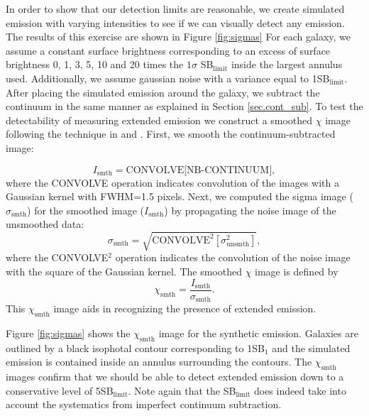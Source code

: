 \documentclass[twocolumn]{aastex61}
\begin{document}
In order to show that our detection limits are reasonable, we create simulated emission with varying intensities to see if we can visually detect any  emission. The results of this exercise are shown in Figure \ref{fig:sigmas} For each galaxy, we assume a constant surface brightness corresponding to an excess of surface brightness 0, 1, 3, 5, 10 and 20 times the $1\sigma$ SB$_{\text{limit}}$ inside the largest annulus used. Additionally, we assume gaussian noise with a variance equal to 1SB$_{\text{limit}}$. After placing the simulated emission around the galaxy, we subtract the continuum in the same manner as explained in Section \ref{sec.cont_sub}. To test the detectability of measuring extended emission we construct a smoothed $\chi$ image following the technique in \cite{Hennawi2013} and \cite{Battaia_2015}. First, we smooth the continuum-subtracted image:

\begin{equation}
I_{\text{smth}}= \text{CONVOLVE[NB-CONTINUUM]},
\end{equation}
where the CONVOLVE operation indicates convolution of the images with a Gaussian kernel with FWHM=1.5 pixels. Next, we computed the sigma image ($\sigma_{\text{smth}}$) for the smoothed image ($I_{\text{smth}}$) by propagating the noise image of the unsmoothed data:
\begin{equation}
\sigma_{\text{smth}}=\sqrt{\text{CONVOLVE}^2[\sigma^2_{\text{unsmth}}]},
\end{equation}
where the CONVOLVE$^2$ operation indicates the convolution of the noise image with the square of the Gaussian kernel. The smoothed $\chi$ image is defined by
\begin{equation}
\chi_{\text{smth}}=\frac{I_{\text{smth}}}{\sigma_{\text{smth}}}.
\end{equation}
This $\chi_{\text{smth}}$ image aids in recognizing the presence of extended  emission. 

Figure \ref{fig:sigmas} shows the $\chi_{\text{smth}}$ image for the synthetic  emission. Galaxies are outlined by a black isophotal contour corresponding to 1SB$_1$ and the simulated emission is contained inside an annulus surrounding the contours. The  $\chi_{\text{smth}}$  images confirm that we should be able to detect extended  emission down to a conservative level of 5SB$_{\text{limit}}$. Note again that the SB$_{\text{limit}}$ does indeed take into account the systematics from imperfect continuum subtraction. 
\end{document}

